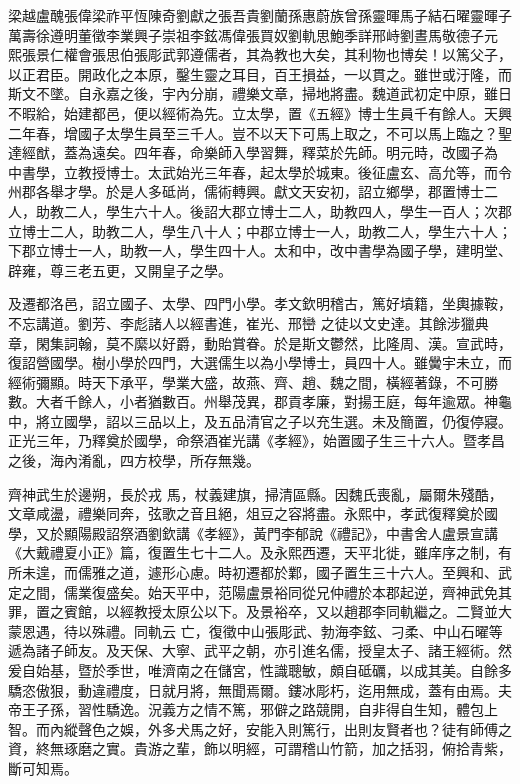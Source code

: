
\begin{pinyinscope}

 梁越盧醜張偉梁祚平恆陳奇劉獻之張吾貴劉蘭孫惠蔚族曾孫靈暉馬子結石曜靈暉子萬壽徐遵明董徵李業興子崇祖李鉉馮偉張買奴劉軌思鮑季詳邢峙劉晝馬敬德子元
 熙張景仁權會張思伯張彫武郭遵儒者，其為教也大矣，其利物也博矣！以篤父子，以正君臣。開政化之本原，鑿生靈之耳目，百王損益，一以貫之。雖世或汙隆，而斯文不墜。自永嘉之後，宇內分崩，禮樂文章，掃地將盡。魏道武初定中原，雖日不暇給，始建都邑，便以經術為先。立太學，置《五經》博士生員千有餘人。天興二年春，增國子太學生員至三千人。豈不以天下可馬上取之，不可以馬上臨之？聖達經猷，蓋為遠矣。四年春，命樂師入學習舞，釋菜於先師。明元時，改國子為
 中書學，立教授博士。太武始光三年春，起太學於城東。後征盧玄、高允等，而令州郡各舉才學。於是人多砥尚，儒術轉興。獻文天安初，詔立鄉學，郡置博士二人，助教二人，學生六十人。後詔大郡立博士二人，助教四人，學生一百人；次郡立博士二人，助教二人，學生八十人；中郡立博士一人，助教二人，學生六十人；下郡立博士一人，助教一人，學生四十人。太和中，改中書學為國子學，建明堂、辟雍，尊三老五更，又開皇子之學。



 及遷都洛邑，詔立國子、太學、四門小學。孝文欽明稽古，篤好墳籍，坐輿據鞍，不忘講道。劉芳、李彪諸人以經書進，崔光、邢巒
 之徒以文史達。其餘涉獵典章，閑集詞翰，莫不縻以好爵，動貽賞眷。於是斯文鬱然，比隆周、漢。宣武時，復詔營國學。樹小學於四門，大選儒生以為小學博士，員四十人。雖黌宇未立，而經術彌顯。時天下承平，學業大盛，故燕、齊、趙、魏之間，橫經著錄，不可勝數。大者千餘人，小者猶數百。州舉茂異，郡貢孝廉，對揚王庭，每年逾眾。神龜中，將立國學，詔以三品以上，及五品清官之子以充生選。未及簡置，仍復停寢。正光三年，乃釋奠於國學，命祭酒崔光講《孝經》，始置國子生三十六人。暨孝昌之後，海內淆亂，四方校學，所存無幾。



 齊神武生於邊朔，長於戎
 馬，杖義建旗，掃清區縣。因魏氏喪亂，屬爾朱殘酷，文章咸盪，禮樂同奔，弦歌之音且絕，俎豆之容將盡。永熙中，孝武復釋奠於國學，又於顯陽殿詔祭酒劉欽講《孝經》，黃門李郁說《禮記》，中書舍人盧景宣講《大戴禮夏小正》篇，復置生七十二人。及永熙西遷，天平北徙，雖庠序之制，有所未遑，而儒雅之道，遽形心慮。時初遷都於鄴，國子置生三十六人。至興和、武定之間，儒業復盛矣。始天平中，范陽盧景裕同從兄仲禮於本郡起逆，齊神武免其罪，置之賓館，以經教授太原公以下。及景裕卒，又以趙郡李同軌繼之。二賢並大蒙恩遇，待以殊禮。同軌云
 亡，復徵中山張彫武、勃海李鉉、刁柔、中山石曜等遞為諸子師友。及天保、大寧、武平之朝，亦引進名儒，授皇太子、諸王經術。然爰自始基，暨於季世，唯濟南之在儲宮，性識聰敏，頗自砥礪，以成其美。自餘多驕恣傲狠，動違禮度，日就月將，無聞焉爾。鏤冰彫朽，迄用無成，蓋有由焉。夫帝王子孫，習性驕逸。況義方之情不篤，邪僻之路競開，自非得自生知，體包上智。而內縱聲色之娛，外多犬馬之好，安能入則篤行，出則友賢者也？徒有師傅之資，終無琢磨之實。貴游之輩，飾以明經，可謂稽山竹箭，加之括羽，俯拾青紫，斷可知焉。




\end{pinyinscope}
